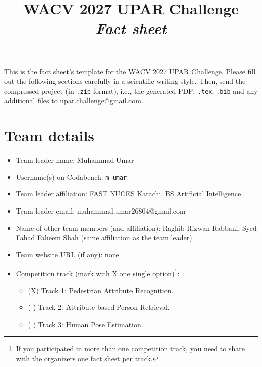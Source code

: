 \documentclass[a4paper, 10pt, conference]{ieeeconf}
\title{WACV 2027 UPAR Challenge\\ \textit{Fact sheet}}
\begin{document}
\maketitle
This is the fact sheet's template for the \href{https://vap.aau.dk/rws/challenge/}{WACV 2027 UPAR Challenge}. Please fill out the following sections carefully in a scientific writing style. Then, send the compressed project (in \texttt{.zip} format), i.e., the generated PDF, \texttt{.tex}, \texttt{.bib} and any additional files to \url{upar.challenge@gmail.com}.
%
%




%
\section{Team details}\label{teamdetails}
\begin{itemize}
    \item Team leader name: Muhammad Umar
    \item Username(s) on Codabench: \texttt{m\_umar}
    \item Team leader affiliation: FAST NUCES Karachi, BS Artificial Intelligence
    \item Team leader email: muhammad.umar26804@gmail.com
    \item Name of other team members (and affiliation): Raghib Rizwan Rabbani, Syed Fahad Faheem Shah (same affiliation as the team leader)
    \item Team website URL (if any): none
    \item Competition track (mark with X one single option)\footnote{If you participated in more than one competition track, you need to share with the organizers one fact sheet per track.}:
    \begin{itemize}
        \item (X) Track 1: Pedestrian Attribute Recognition.
        \item ( ) Track 2: Attribute-based Person Retrieval.
        \item ( ) Track 3: Human Pose Estimation.
    \end{itemize}
\end{itemize}
%
%
\end{document}
